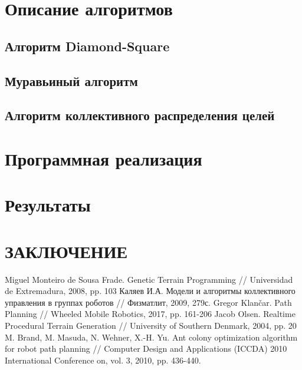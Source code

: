 \documentclass{article}
\begin{document}
	\newpage
    \section{Описание алгоритмов}

    \subsection{Алгоритм Diamond-Square}

    \subsection{Муравьиный алгоритм}

    \subsection{Алгоритм коллективного распределения целей}

    \newpage
    \section{Программная реализация}

	\newpage
    \section{Результаты}

    \newpage
    \section*{ЗАКЛЮЧЕНИЕ}

    \newpage
	\renewcommand\refname{ЛИТЕРАТУРА}
	\begin{thebibliography}{}
		 Miguel Monteiro de Sousa Frade. Genetic Terrain Programming // Universidad de Extremadura, 2008, pp. 103
		 Каляев И.А. Модели и алгоритмы коллективного управления в группах роботов // Физматлит, 2009, 279с.
		 Gregor Klančar. Path Planning // Wheeled Mobile Robotics, 2017, pp. 161-206
		 Jacob Olsen. Realtime Procedural Terrain Generation // University of Southern Denmark, 2004, pp. 20
		 M. Brand, M. Masuda, N. Wehner, X.-H. Yu. Ant colony optimization algorithm for robot path planning // Computer Design and Applications (ICCDA) 2010 International Conference on, vol. 3, 2010, pp. 436-440.
	\end{thebibliography}
\end{document}
